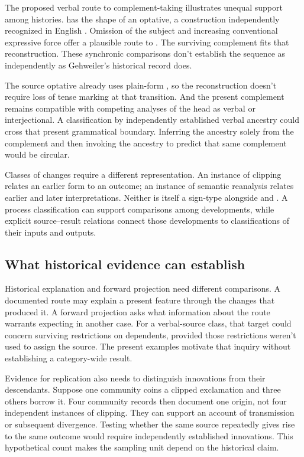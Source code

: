 \documentclass[12pt]{article}
\begin{document}
The proposed verbal route to complement-taking  illustrates
unequal support among histories.  has the shape
of an optative, a construction independently recognized in English
\citep[944]{HuddlestonPullum2002}. Omission of the subject and increasing
conventional expressive force offer a plausible route to . The surviving complement fits that reconstruction. These synchronic
comparisons don't establish the sequence as independently as Gehweiler's
historical record does.

The source optative already uses plain-form , so the
reconstruction doesn't require loss of tense marking at that transition.
And the present complement remains compatible with competing analyses
of the head as verbal or interjectional. A classification by independently
established verbal ancestry could cross that present grammatical boundary.
Inferring the ancestry solely from the complement and then invoking
the ancestry to predict that same complement would be circular.

Classes of changes require a different representation. An instance of
clipping relates an earlier form to an outcome; an instance of semantic
reanalysis relates earlier and later interpretations. Neither is itself
a sign-type alongside  and . A process
classification can support comparisons among developments, while explicit
source--result relations connect those developments to classifications
of their inputs and outputs.

\subsection{What historical evidence can establish}

Historical explanation and forward projection need different comparisons.
A documented route may explain a present feature through the changes
that produced it. A forward projection asks what information about the
route warrants expecting in another case. For a verbal-source class,
that target could concern surviving restrictions on dependents, provided
those restrictions weren't used to assign the source. The present
examples motivate that inquiry without establishing a category-wide result.

Evidence for replication also needs to distinguish innovations from their
descendants. Suppose one community coins a clipped exclamation and
three others borrow it. Four community records then document one
origin, not four independent instances of clipping. They can support
an account of transmission or subsequent divergence. Testing whether
the same source repeatedly gives rise to the same outcome would
require independently established innovations. This hypothetical count
makes the sampling unit depend on the historical claim.
\end{document}
